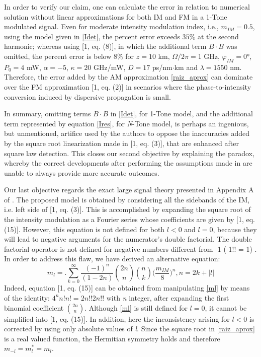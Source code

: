 \documentclass[journal]{IEEEtran}
\begin{document}
In order to verify our claim, one can calculate the error in relation to numerical solution without linear approximations for both IM and FM in a 1-Tone modulated signal. Even for moderate intensity modulation index, i.e., $m_{IM} = 0.5$, using the model given in \eqref{Idet}, the percent error exceeds $35\%$ at the second harmonic; whereas using [1, eq. (8)], in which the additional term $B\cdot B$ was omitted, the percent error is below $8\%$ for $z = 10$ km, $\Omega/2\pi = 1$ GHz, $\varphi_{IM} = 0°$, $P_0 = 4$ mW, $\alpha = -5$, $\kappa = 20$ GHz/mW, $D = 17$ ps/nm$\cdot$km and $\lambda = 1550$ nm. Therefore, the error added by the AM approximation \eqref{raiz_aprox} can dominate over the FM approximation [1, eq. (2)] in scenarios where the phase-to-intensity conversion induced by dispersive propagation is small.

In summary, omitting terms $B \cdot B$ in \eqref{Idet}, for 1-Tone model, and the additional term represented by equation \eqref{Ires}, for \emph{N}-Tone model, is perhaps an ingenious, but unmentioned, artifice used by the authors to oppose the inaccuracies added by the square root linearization made in [1, eq. (3)], that are enhanced after square law detection. This closes our second objective by explaining the paradox, whereby the correct developments after performing the assumptions made in \cite{eva} are unable to always provide more accurate outcomes. 

Our last objective regards the exact large signal theory presented in Appendix A of \cite{eva}. The proposed model is obtained by considering all the sidebands of the IM, i.e. left side of [1, eq. (3)]. This is accomplished by expanding the square root of the intensity modulation as a Fourier series whose coefficients are given by [1, eq. (15)]. However, this equation is not defined for both $l < 0$ and $l = 0$, because they will lead to negative arguments for the numerator's double factorial. The double factorial operator is not defined for negative numbers different from -1 (-1!! = 1) \cite{Arfken}.  In order to address this flaw, we have derived an alternative equation:
\begin{equation} \label{ml}
m_l = \bigg.\sum_{k = 0}^{\infty}\frac{(-1)^n}{(1 - 2n)}\binom{2n}{n}\binom{n}{k}\bigg(\frac{m_{IM}}{8}\bigg)^n, n = 2k + |l|
\end{equation}
Indeed, equation [1, eq. (15)] can be obtained from manipulating \eqref{ml} by means of the identity: $4^nn!n! = 2n!!2n!!$ with \emph{n} integer, after expanding the first binomial coefficient $\binom{2n}{n}$. Although \eqref{ml} is still defined for $l = 0$, it cannot be simplified into [1, eq. (15)]. In addition, here the inconsistency arising for $l < 0$ is corrected by using only absolute values of \emph{l}. Since the square root in \eqref{raiz_aprox} is a real valued function, the Hermitian symmetry holds and therefore $m_{-l} = m_l^* = m_l$. 
\end{document}
